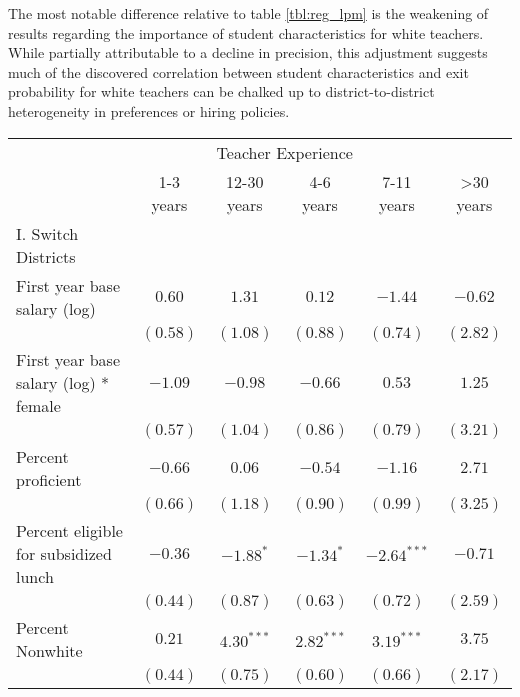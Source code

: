 \documentclass[12pt,]{article}
\begin{document}
The most notable difference relative to table \ref{tbl:reg_lpm} is the
weakening of results regarding the importance of student characteristics
for white teachers. While partially attributable to a decline in
precision, this adjustment suggests much of the discovered correlation
between student characteristics and exit probability for white teachers
can be chalked up to district-to-district heterogeneity in preferences
or hiring policies.

\begin{table}
\begin{center}
\begin{tabular}{l c c c c c }
\hline
 & \multicolumn{4}{c}{Teacher Experience} \\ \cline{2-6}
 & 1-3 years & 12-30 years & 4-6 years & 7-11 years & >30 years \\
\hline
I. Switch Districts                             &              &              &               &               &             \\
\quad First year base salary (log)           & $0.60$       & $1.31$       & $0.12$        & $-1.44$       & $-0.62$     \\
                                                & $(0.58)$     & $(1.08)$     & $(0.88)$      & $(0.74)$      & $(2.82)$    \\
\quad First year base salary (log) * female  & $-1.09$      & $-0.98$      & $-0.66$       & $0.53$        & $1.25$      \\
                                                & $(0.57)$     & $(1.04)$     & $(0.86)$      & $(0.79)$      & $(3.21)$    \\
\quad Percent proficient                     & $-0.66$      & $0.06$       & $-0.54$       & $-1.16$       & $2.71$      \\
                                                & $(0.66)$     & $(1.18)$     & $(0.90)$      & $(0.99)$      & $(3.25)$    \\
\quad Percent eligible for subsidized lunch  & $-0.36$      & $-1.88^{*}$  & $-1.34^{*}$   & $-2.64^{***}$ & $-0.71$     \\
                                                & $(0.44)$     & $(0.87)$     & $(0.63)$      & $(0.72)$      & $(2.59)$    \\
\quad Percent Nonwhite                       & $0.21$       & $4.30^{***}$ & $2.82^{***}$  & $3.19^{***}$  & $3.75$      \\
                                                & $(0.44)$     & $(0.75)$     & $(0.60)$      & $(0.66)$      & $(2.17)$    \\

\end{tabular}
\end{center}
\end{table}
\end{document}
